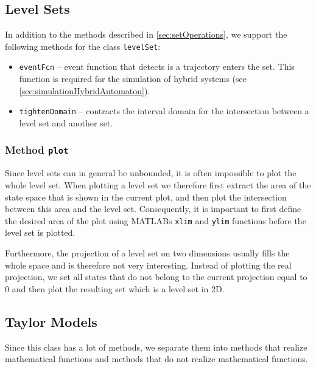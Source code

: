 \subsection{Level Sets}    \label{sec:levelSetOperations}

In addition to the methods described in \cref{sec:setOperations}, we support the following methods for the class \texttt{levelSet}:
\begin{itemize}
    \item \texttt{eventFcn} -- event function that detects is a trajectory enters the set. This function is required for the simulation of hybrid systems (see \cref{sec:simulationHybridAutomaton}).
    \item \texttt{tightenDomain} -- contracts the interval domain for the intersection between a level set and another set.
\end{itemize}

\subsubsection{Method \texttt{plot}}

Since level sets can in general be unbounded, it is often impossible to plot the whole level set. When plotting a level set we therefore first extract the area of the state space that is shown in the current plot, and then plot the intersection between this area and the level set. Consequently, it is important to first define the desired area of the plot using MATLABs \texttt{xlim} and \texttt{ylim} functions before the level set is plotted.

Furthermore, the projection of a level set on two dimensions usually fills the whole space and is therefore not very interesting. Instead of plotting the real projection, we set all states that do not belong to the current projection equal to 0 and then plot the resulting set which is a level set in 2D.



\subsection{Taylor Models}    \label{sec:taylorModelOperations}


Since this class has a lot of methods, we separate them into methods that realize mathematical functions and methods that do not realize mathematical functions.

